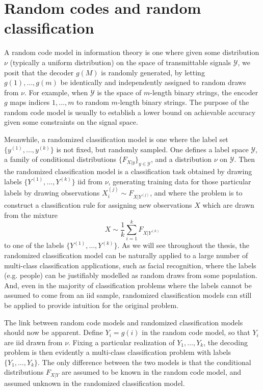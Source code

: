 
\section{Random codes and random classification}

A random code model in information theory is one where given some
distribution $\nu$ (typically a uniform distribution) on the space of
transmittable signals $\mathcal{Y}$, we posit that the decoder $g(M)$
is randomly generated, by letting $g(1),\hdots, g(m)$ be identically
and independently assigned to random draws from $\nu$.  For example,
when $\mathcal{Y}$ is the space of $m$-length binary strings, the
encoder $g$ maps indices $1, \hdots, m$ to random $m$-length binary
strings.  The purpose of the random code model is usually to establish
a lower bound on achievable accuracy given some constraints on the
signal space.

Meanwhile, a randomized classification model is one where the label
set $\{y^{(1)},\hdots, y^{(k)}\}$ is not fixed, but randomly sampled.
One defines a label space $\mathcal{Y}$, a family of conditional
distributions $\{F_{X|y}\}_{y \in \mathcal{Y}}$, and a distribution
$\nu$ on $\mathcal{Y}$.  Then the randomized classification model is a
classification task obtained by drawing labels $\{Y^{(1)},\hdots,
Y^{(k)}\}$ iid from $\nu$, generating training data for those
particular labels by drawing observations $X_i^{(j)} \sim
F_{X|Y^{(j)}}$, and where the problem is to construct a classification
rule for assigning new observations $X$ which are drawn from the
mixture
\[
X \sim \frac{1}{k}\sum_{i=1}^k F_{X|Y^{(k)}}
\]
to one of the labels $\{Y^{(1)},\hdots, Y^{(k)}\}.$ As we will see
throughout the thesis, the randomized classification model can be
naturally applied to a large number of multi-class classification
applications, such as facial recognition, where the labels
(e.g. people) can be justifiably modelled as random draws from some
population.  And, even in the majority of classification problems
where the labels cannot be assumed to come from an iid sample,
randomized classification models can still be applied to provide
intuition for the original problem.

The link between random code models and randomized classification
models should now be apparent. Define $Y_i = g(i)$ in the random code
model, so that $Y_i$ are iid drawn from $\nu$.  Fixing a particular
realization of $Y_1,\hdots, Y_k$, the decoding problem is then
evidently a multi-class classification problem with labels
$\{Y_1,\hdots, Y_k\}$.  The only difference between the two models is
that the conditional distributions $F_{X|Y}$ are assumed to be known
in the random code model, and assumed unknown in the randomized
classification model.

